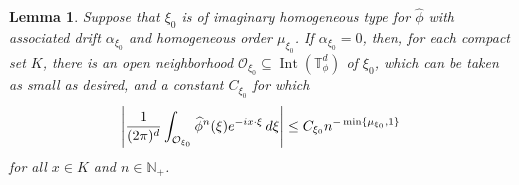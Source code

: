 \documentclass[11pt, letter]{book}
\newtheorem{lemma}[theorem]{Lemma}
\newcommand\Interior{\operatorname{Int}}
\newcommand{\f}[2]{\frac{#1}{#2}}
\begin{document}
\begin{framed}
\begin{lemma}\label{lem:EstImagHom}
Suppose that $\xi_0$ is of imaginary homogeneous type for $\widehat{\phi}$ with associated drift $\alpha_{\xi_0}$ and homogeneous order $\mu_{\xi_0}$. If $\alpha_{\xi_0}=0$, then, for each compact set $K$, there is an open neighborhood $\mathcal{O}_{\xi_0}\subseteq\Interior(\mathbb{T}_\phi^d)$ of $\xi_0$, which can be taken as small as desired, and a constant $C_{\xi_0}$ for which
\begin{equation*}
    \abs{\f{1}{(2\pi)^d}\int_{\mathcal{O}_{\xi_0}}\widehat{\phi}^n(\xi)e^{-ix\cdot\xi}\,d\xi}\leq C_{\xi_0}n^{-\min\{\mu_{\xi_0},1\}}
\end{equation*}
for all $x\in K$ and $n\in\mathbb{N}_+$.
\end{lemma}
\end{framed}
\end{document}
